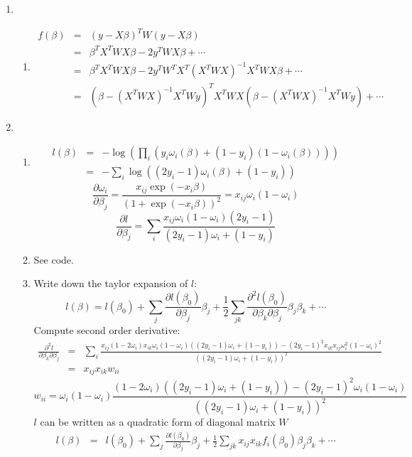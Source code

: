 \documentclass{article}
\begin{document}
\begin{enumerate}
\item
\begin{enumerate}[A]
\item
\begin{eqnarray}
f(\beta)&=&(y-X\beta)^TW(y-X\beta)\nonumber\\
&=&\beta^TX^TWX\beta-2y^TWX\beta+\cdots\nonumber\\
&=&\beta^T X^TWX\beta-2y^TW^TX^T(X^TWX)^{-1}X^TWX\beta+\cdots\nonumber\\
&=&(\beta-(X^TWX)^{-1}X^TWy)^TX^TWX(\beta-(X^TWX)^{-1}X^TWy)+\cdots
\end{eqnarray}
\end{enumerate}
\item
\begin{enumerate}[A]
\item
\begin{eqnarray}
l(\beta)&=&-\log(\prod_i(y_i\omega_i(\beta)+(1-y_i)(1-\omega_i(\beta))))\nonumber\\
&=&-\sum_i\log((2y_i-1)\omega_i(\beta)+(1-y_i))
\end{eqnarray}
\[
\frac{\partial\omega_i}{\partial\beta_j}=\frac{x_{ij}\exp(-x_i\beta)}{(1+\exp(-x_i\beta))^2}=x_{ij}\omega_i(1-\omega_i)
\]
\[
\frac{\partial l}{\partial\beta_j}=\sum_i\frac{x_{ij}\omega_i(1-\omega_i)(2y_i-1)}{(2y_i-1)\omega_i+(1-y_i)}
\]
\item
See code.
\item
Write down the taylor expansion of $l$:
\[
l(\beta)=l(\beta_0)+\sum_j\frac{\partial l(\beta_0)}{\partial\beta_j}\beta_j+\frac{1}{2}\sum_{jk}\frac{\partial^2l(\beta_0)}{\partial\beta_k\partial\beta_j}\beta_j\beta_k+\cdots
\]
Compute second order derivative:
\begin{eqnarray}
\frac{\partial^2 l}{\partial\beta_k\partial\beta_j}&=&\sum_i\frac{x_{ij}(1-2\omega_i)x_{ik}\omega_i(1-\omega_i)((2y_i-1)\omega_i+(1-y_i))-(2y_i-1)^2x_{ik}x_{ij}\omega_i^2(1-\omega_i)^2}{((2y_i-1)\omega_i+(1-y_i))^2}\nonumber\\
&=&x_{ij}x_{ik}w_{ii}
\end{eqnarray}
\[
w_{ii}=\omega_i(1-\omega_i)\frac{(1-2\omega_i)((2y_i-1)\omega_i+(1-y_i))-(2y_i-1)^2\omega_i(1-\omega_i)}{((2y_i-1)\omega_i+(1-y_i))^2}
\]
$l$ can be written as a quadratic form of diagonal matrix $W$
\begin{eqnarray}
l(\beta)&=&l(\beta_0)+\sum_j\frac{\partial l(\beta_0)}{\partial\beta_j}\beta_j+\frac{1}{2}\sum_{jk}x_{ij}x_{ik}f_i(\beta_0)\beta_j\beta_k+\cdots\nonumber\\

\end{eqnarray}
\end{enumerate}
\end{enumerate}
\end{document}
